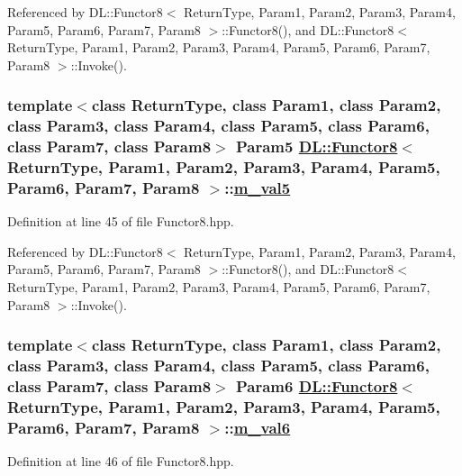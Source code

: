 Referenced by DL::Functor8$<$ Return\-Type, Param1, Param2, Param3, Param4, Param5, Param6, Param7, Param8 $>$::Functor8(), and DL::Functor8$<$ Return\-Type, Param1, Param2, Param3, Param4, Param5, Param6, Param7, Param8 $>$::Invoke().\hypertarget{classDL_1_1Functor8_r5}{
\subsubsection[m\_\-val5]{\setlength{\rightskip}{0pt plus 5cm}template$<$class Return\-Type, class Param1, class Param2, class Param3, class Param4, class Param5, class Param6, class Param7, class Param8$>$ Param5 \hyperlink{classDL_1_1Functor8}{DL::Functor8}$<$ Return\-Type, Param1, Param2, Param3, Param4, Param5, Param6, Param7, Param8 $>$::\hyperlink{classDL_1_1Functor8_r5}{m\_\-val5}}}
\label{classDL_1_1Functor8_r5}




Definition at line 45 of file Functor8.hpp.

Referenced by DL::Functor8$<$ Return\-Type, Param1, Param2, Param3, Param4, Param5, Param6, Param7, Param8 $>$::Functor8(), and DL::Functor8$<$ Return\-Type, Param1, Param2, Param3, Param4, Param5, Param6, Param7, Param8 $>$::Invoke().\hypertarget{classDL_1_1Functor8_r6}{
\subsubsection[m\_\-val6]{\setlength{\rightskip}{0pt plus 5cm}template$<$class Return\-Type, class Param1, class Param2, class Param3, class Param4, class Param5, class Param6, class Param7, class Param8$>$ Param6 \hyperlink{classDL_1_1Functor8}{DL::Functor8}$<$ Return\-Type, Param1, Param2, Param3, Param4, Param5, Param6, Param7, Param8 $>$::\hyperlink{classDL_1_1Functor8_r6}{m\_\-val6}}}
\label{classDL_1_1Functor8_r6}




Definition at line 46 of file Functor8.hpp.

